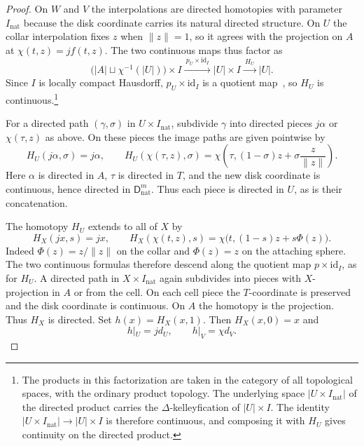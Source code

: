\documentclass[12pt,a4paper]{amsart}
\theoremstyle{definition}
\newcommand{\rev}[1]{#1_{\mathrm{nat}}}
\newcommand{\Iv}{\rev{I}}
\newcommand{\abs}[1]{\lvert#1\rvert}
\begin{document}
\begin{proof}
On $W$ and $V$ the interpolations are directed homotopies with parameter $\Iv$ because the disk coordinate carries its natural directed structure. On $U$ the collar interpolation fixes $z$ when $\|z\|=1$, so it agrees with the projection on $A$ at $\chi(t,z)=jf(t,z)$. The two continuous maps thus factor as
\[
 \bigl(\abs A\sqcup\chi^{-1}(\abs U)\bigr)\times I
 \xrightarrow{\ p_U\times\mathrm{id}_I\ }
 \abs U\times I \xrightarrow{\ H_U\ } \abs U .
\]
Since $I$ is locally compact Hausdorff, $p_U\times\mathrm{id}_I$ is a quotient map~\cite[Section~29, Exercise~11(a)]{zbMATH01461253}, so $H_U$ is continuous.\footnote{The products in this factorization are taken in the category of all topological spaces, with the ordinary product topology. The underlying space $\abs{U\times\Iv}$ of the directed product carries the $\Delta$-kelleyfication of $\abs U\times I$. The identity $\abs{U\times\Iv}\to\abs U\times I$ is therefore continuous, and composing it with $H_U$ gives continuity on the directed product.}

For a directed path $(\gamma,\sigma)$ in $U\times\Iv$, subdivide $\gamma$ into directed pieces $j\alpha$ or $\chi(\tau,z)$ as above. On these pieces the image paths are given pointwise by
\[
 H_U(j\alpha,\sigma)=j\alpha,\qquad
 H_U(\chi(\tau,z),\sigma)=\chi\!\left(\tau,(1-\sigma)z+\sigma\frac{z}{\|z\|}\right).
\]
Here $\alpha$ is directed in $A$, $\tau$ is directed in $T$, and the new disk coordinate is continuous, hence directed in $\rev{\mathsf{D}^m}$. Thus each piece is directed in $U$, as is their concatenation.

The homotopy $H_U$ extends to all of $X$ by
\[
 H_X(jx,s)=jx,\qquad H_X(\chi(t,z),s)=\chi\bigl(t,(1-s)z+s\Phi(z)\bigr).
\]
Indeed $\Phi(z)=z/\|z\|$ on the collar and $\Phi(z)=z$ on the attaching sphere. The two continuous formulas therefore descend along the quotient map $p\times\mathrm{id}_I$, as for $H_U$. A directed path in $X\times\Iv$ again subdivides into pieces with $X$-projection in $A$ or from the cell. On each cell piece the $T$-coordinate is preserved and the disk coordinate is continuous. On $A$ the homotopy is the projection. Thus $H_X$ is directed. Set $h(x)=H_X(x,1)$. Then $H_X(x,0)=x$ and
\[
 h|_U=jd_U,\qquad h|_V=\chi d_V .
\]
\end{proof}
\end{document}
